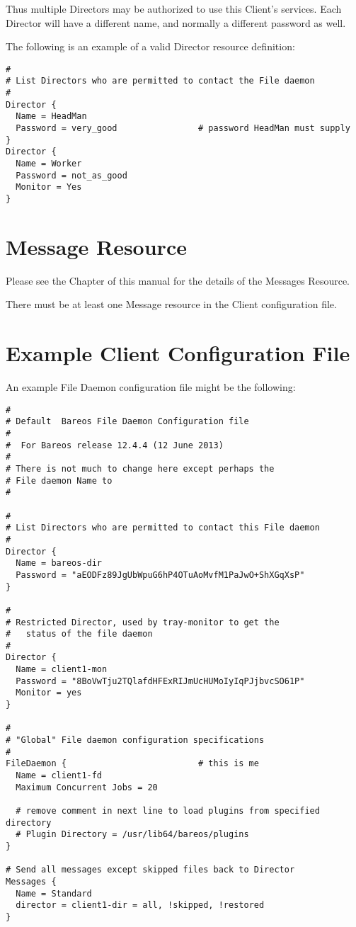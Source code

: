 Thus multiple Directors may be authorized to use this Client's services. Each
Director will have a different name, and normally a different password as
well.

The following is an example of a valid Director resource definition:

\footnotesize
\begin{verbatim}
#
# List Directors who are permitted to contact the File daemon
#
Director {
  Name = HeadMan
  Password = very_good                # password HeadMan must supply
}
Director {
  Name = Worker
  Password = not_as_good
  Monitor = Yes
}
\end{verbatim}
\normalsize

\section{Message Resource}
\label{MessagesResource3}

Please see the
 Chapter of this
manual for the details of the Messages Resource.

There must be at least one Message resource in the Client configuration file.

\section{Example Client Configuration File}
\label{SampleClientConfiguration}

An example File Daemon configuration file might be the following:

\footnotesize
\begin{verbatim}
#
# Default  Bareos File Daemon Configuration file
#
#  For Bareos release 12.4.4 (12 June 2013)
#
# There is not much to change here except perhaps the
# File daemon Name to
#

#
# List Directors who are permitted to contact this File daemon
#
Director {
  Name = bareos-dir
  Password = "aEODFz89JgUbWpuG6hP4OTuAoMvfM1PaJwO+ShXGqXsP"
}

#
# Restricted Director, used by tray-monitor to get the
#   status of the file daemon
#
Director {
  Name = client1-mon
  Password = "8BoVwTju2TQlafdHFExRIJmUcHUMoIyIqPJjbvcSO61P"
  Monitor = yes
}

#
# "Global" File daemon configuration specifications
#
FileDaemon {                          # this is me
  Name = client1-fd
  Maximum Concurrent Jobs = 20

  # remove comment in next line to load plugins from specified directory
  # Plugin Directory = /usr/lib64/bareos/plugins
}

# Send all messages except skipped files back to Director
Messages {
  Name = Standard
  director = client1-dir = all, !skipped, !restored
}
\end{verbatim}
\normalsize
